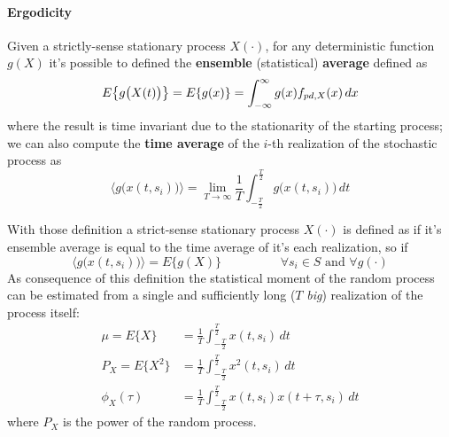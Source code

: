 		\paragraph{Ergodicity} Given a strictly-sense stationary process $X(\cdot)$, for any deterministic function $g(X)$ it's possible to defined the \textbf{ensemble} (statistical) \textbf{average} defined as
		\begin{equation}
			E\big\{ g\big(X(t)\big) \big\} = E\{g(x)\} = \int_{-\infty}^\infty g(x) f_{pd,X}(x)\, dx
		\end{equation}
		where the result is time invariant due to the stationarity of the starting process; we can also compute the \textbf{time average} of the $i$-th realization of the stochastic process as
		\begin{equation}
			\big\langle g\big(x(t,s_i)\big) \big \rangle = \lim_{T\rightarrow \infty} \frac 1 T \int_{-\frac T 2}^{\frac T2} g\big( x(t,s_i) \big)\, dt 
		\end{equation}
		
		With those definition a strict-sense stationary process $X(\cdot)$ is defined as  if it's ensemble average is equal to the time average of it's each realization, so if
		\[ \big\langle g\big(x(t,s_i)\big) \big \rangle = E\{g(X)\} \hspace{2cm} \forall s_i \in S \textrm{ and } \forall g(\cdot) \]
		As consequence of this definition the statistical moment of the random process can be estimated from a single and sufficiently long ($T$ \textit{big}) realization of the process itself:
		\begin{equation}
		\begin{aligned}
			\mu = E\{X\} & = \frac 1 T \int_{-\frac T 2}^{\frac T2} x(t,s_i)\, dt \\
			P_X = E\{X^2\} & = \frac 1 T\int_{-\frac T 2}^{\frac T2} x^2(t,s_i)\, dt \\
			\phi_X(\tau) & = \frac 1T\int_{-\frac T 2}^{\frac T2} x(t,s_i) x(t+\tau, s_i)\, dt
		\end{aligned}
		\end{equation}
		where $P_X$ is the power of the random process.
		
